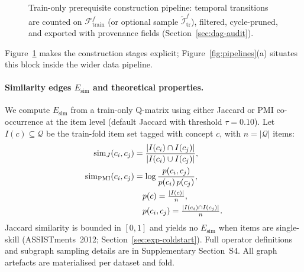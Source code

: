 \documentclass[pdflatex,sn-mathphys-num]{sn-jnl}
\newcommand{\Esim}{\ensuremath{E_{\text{sim}}}}
\begin{document}
\begin{figure}[!t]
\centering
{}
\caption{Train-only prerequisite construction pipeline: temporal transitions
are counted on $\mathcal{F}^f_{\text{train}}$ (or optional sample
$\tilde{\mathcal{I}}^f_{\text{tr}}$), filtered, cycle-pruned, and exported
with provenance fields (Section~\ref{sec:dag-audit}).}
\label{fig:kc-construction}
\end{figure}

Figure~\ref{fig:kc-construction} makes the construction stages explicit;
Figure~\ref{fig:pipelines}(a) situates this block inside the wider data
pipeline.

\paragraph{Similarity edges $\Esim$ and theoretical properties.}
\label{sec:graph-sim-theory}
We compute $\Esim$ from a train-only Q-matrix using either Jaccard or
PMI co-occurrence at the item level (default Jaccard with threshold
$\tau{=}0.10$). Let $I(c)\subseteq\mathcal{Q}$ be the train-fold item
set tagged with concept $c$, with $n=|\mathcal{Q}|$ items:
\begin{align}
\mathrm{sim}_J(c_i,c_j) &=
  \frac{|I(c_i)\cap I(c_j)|}{|I(c_i)\cup I(c_j)|},
  \label{eq:sim-jaccard}\\
\mathrm{sim}_{\mathrm{PMI}}(c_i,c_j) &=
  \log \frac{p(c_i,c_j)}{p(c_i)\,p(c_j)},
  \label{eq:sim-pmi}\notag\\
&\quad p(c)=\tfrac{|I(c)|}{n},\notag\\
&\quad p(c_i,c_j)=\tfrac{|I(c_i)\cap I(c_j)|}{n}.
\end{align}
Jaccard similarity is bounded in $[0,1]$ and yields no $\Esim$ when items are
single-skill (ASSISTments~2012; Section~\ref{sec:exp-coldstart}). Full
operator definitions and subgraph sampling details are in Supplementary
Section~S4. All graph artefacts are materialised per dataset and fold.
\end{document}
